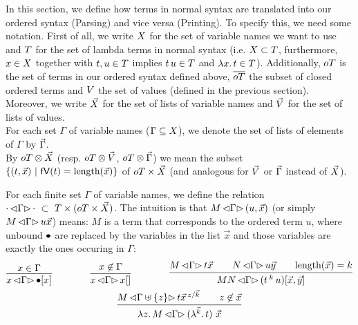 \documentclass[submission,copyright,creativecommons]{eptcs}
\begin{document}
In this section, we define how terms in normal syntax are translated into our ordered syntax (Parsing) and vice versa (Printing). 
To specify this, we need some notation. 
First of all, we write $X$ for the set of variable names we want to use and $T$ for the set of lambda terms in normal syntax (i.e. $X \subset T$, furthermore, $x \in X$ together with $t, u \in T$ implies $t \, u \in T$ and $\lambda {x}. \, t \in T$). Additionally, $oT$ is the set of terms in our ordered syntax defined above, $\overline{oT}$ the subset of closed ordered terms and $V$ the set of values (defined in the previous section).
Moreover, we write $\vec {X}$ for the set of lists of variable names and $\vec {V}$ for the set of lists of values. 
\\
For each set $\Gamma$ of variable names ($\Gamma \subseteq X$), we denote the set of lists of elements of $\Gamma$ by $\vec \Gamma$. 
\\
By $oT \otimes \vec {X}$ (resp. $oT \otimes \vec {V}$, $oT \otimes \vec \Gamma$) we mean the subset $\{(t, \vec x) \ | \ \mathsf{fV}(t) = \mbox{length}(\vec x) \}$ of $oT \times \vec {X}$ (and analogous for $\vec {V}$ or $\vec \Gamma$ instead of $\vec {X}$).
\\
\begin{defin}
For each finite %
set $\Gamma$ of variable names, we define the relation
$\cdot \, { \mathord{\lhd} {\Gamma} \mathord{\rhd} } \, \cdot \ \subset \  T \times (oT \times \vec {X})$.
The intuition is that $M \, { \mathord{\lhd} {\Gamma} \mathord{\rhd} } \, (u, \vec x)$ (or simply $M \, { \mathord{\lhd} {\Gamma} \mathord{\rhd} } \, u \vec x$) means: $M$ is a term that corresponds to the ordered term $u$, where unbound $\mathord{\bullet}$ are replaced by the variables in the list $\vec x$ and those variables are exactly the ones occuring in $\Gamma$:
\begin{gather*}
\infru{x \in \Gamma}{\parse x \Gamma {\ovar \ve x}}
\qquad
\qquad
\infru{x \not\in \Gamma}{\parse x \Gamma {x \emptyVec}}
\qquad
\qquad
\infru{ {\parse M \Gamma {t \vec x}} \qquad {\parse N \Gamma {u \vec y}} \qquad {\length{\vec x} = k} } {\parse {MN} {\Gamma} {(\ApO t k u) [\vec x, \vec y]} } \\
\infru{ 
         {\parse M { \Gamma \uplus \{z\} } {       t \multiinsert{\vec x}{\vec k}{z}   }} 
          \qquad 
          z \not\in \vec x  }
          {\parse {\LaA z M} {\Gamma} {(\LaO {\vec{k}} t) \ \vec x}}
\end{gather*}
\end{defin}
\end{document}

